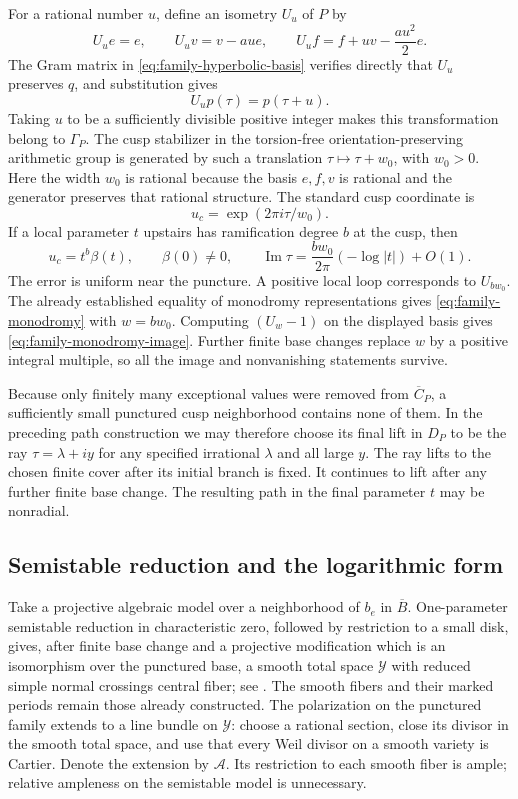 For a rational number $u$, define an isometry $U_u$ of $P$ by
\[
 U_ue=e,\qquad U_uv=v-au e,\qquad
 U_uf=f+u v-\frac{au^2}{2}e.
\]
The Gram matrix in \eqref{eq:family-hyperbolic-basis} verifies
directly that $U_u$ preserves $q$, and substitution gives
\[
 U_up(\tau)=p(\tau+u).
\]
Taking $u$ to be a sufficiently divisible positive integer makes
this transformation belong to $\Gamma_P$.  The cusp stabilizer in the
torsion-free orientation-preserving arithmetic group is generated
by such a translation $\tau\mapsto\tau+w_0$, with $w_0>0$.
Here the width $w_0$ is rational because the basis $e,f,v$ is
rational and the generator preserves that rational structure.
The standard cusp coordinate is
\[
 u_c=\exp(2\pi i\tau/w_0).
\]
If a local parameter $t$ upstairs has ramification degree $b$ at
the cusp, then
\begin{equation}
 \label{eq:family-cusp-coordinate}
 u_c=t^b\beta(t),\qquad \beta(0)\ne0,
 \qquad
 \operatorname{Im}\tau
    =\frac{bw_0}{2\pi}(-\log|t|)+O(1).
\end{equation}
The error is uniform near the puncture.  A positive local loop
corresponds to $U_{bw_0}$.  The already established equality of
monodromy representations gives \eqref{eq:family-monodromy}
with $w=bw_0$.  Computing $(U_w-1)$ on the displayed basis gives
\eqref{eq:family-monodromy-image}.  Further finite base changes
replace $w$ by a positive integral multiple, so all the image
and nonvanishing statements survive.

Because only finitely many exceptional values were removed from
$\overline C_P$, a sufficiently small punctured cusp neighborhood
contains none of them.  In the preceding path construction we may
therefore choose its final lift in $D_P$ to be the ray
$\tau=\lambda+iy$ for any specified irrational $\lambda$ and all
large $y$.  The ray lifts to the chosen finite cover after its
initial branch is fixed.  It continues to lift after any further
finite base change.  The resulting path in the final parameter $t$
may be nonradial.

\subsection{Semistable reduction and the logarithmic form}

Take a projective algebraic model over a neighborhood of $b_e$ in
$\overline B$.  One-parameter semistable reduction in
characteristic zero, followed by restriction to a small disk,
gives, after finite base change and a projective modification
which is an isomorphism over the punctured base, a smooth total
space $\mathcal Y$ with reduced simple normal crossings central
fiber; see \cite[Chapter~II, Semi-stable Reduction Theorem,
pp.~53--54]{Semistable}.  The smooth fibers and their marked
periods remain those already constructed.  The polarization on
the punctured family extends to a line bundle on $\mathcal Y$:
choose a rational section, close its divisor in the smooth total
space, and use that every Weil divisor on a smooth variety is
Cartier.  Denote the extension by $\mathcal A$.  Its restriction
to each smooth fiber is ample; relative ampleness on the
semistable model is unnecessary.

